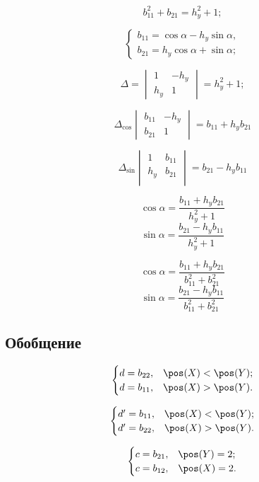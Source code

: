 $$b_{11}^2 + b_{21} = h_y^2 + 1;$$

$$\begin{cases}
	b_{11} = \cos\alpha - {h_y} \sin\alpha,\\
	b_{21} = {h_y} \cos\alpha + \sin\alpha;
\end{cases}$$

$$\Delta = \begin{vmatrix}
	1 & -h_y\\
	h_y & 1
\end{vmatrix} = h_y^2 + 1;$$

$$\Delta_{\cos}\begin{vmatrix}
	b_{11} & -h_y\\
	b_{21} & 1
\end{vmatrix} = b_{11} + h_y b_{21}$$

$$\Delta_{\sin}\begin{vmatrix}
	1   & b_{11}\\
	h_y & b_{21}\\
\end{vmatrix} = b_{21} - h_y b_{11}$$


$$\cos\alpha = \frac{b_{11} + h_y b_{21}}{h_y^2 + 1}$$
$$\sin\alpha = \frac{b_{21} - h_y b_{11}}{h_y^2 + 1}$$

$$\cos\alpha = \frac{b_{11} + h_y b_{21}}{b_{11}^2 + b_{21}^2}$$
$$\sin\alpha = \frac{b_{21} - h_y b_{11}}{b_{11}^2 + b_{21}^2}$$


\subsection{Обобщение}

$$\begin{cases}
	d = b_{22}, & \pos(X) < \pos(Y); \\
	d = b_{11}, & \pos(X) > \pos(Y). \\
\end{cases}$$

$$\begin{cases}
	d' = b_{11}, & \pos(X) < \pos(Y); \\
	d' = b_{22}, & \pos(X) > \pos(Y). \\
\end{cases}$$

$$\begin{cases}
	c = b_{21}, & \pos(Y) = 2; \\
	c = b_{12}, & \pos(X) = 2. \\
\end{cases}$$

